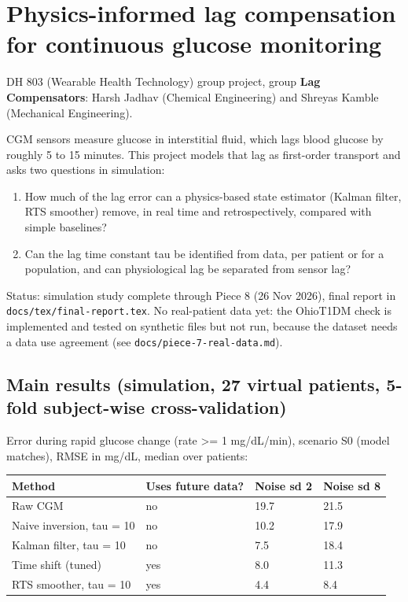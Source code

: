 \documentclass[11pt,a4paper]{article}
\providecommand{\tightlist}{\setlength{\itemsep}{0pt}\setlength{\parskip}{0pt}}
\begin{document}
\hypertarget{physics-informed-lag-compensation-for-continuous-glucose-monitoring}{%
\section{Physics-informed lag compensation for continuous glucose
monitoring}\label{physics-informed-lag-compensation-for-continuous-glucose-monitoring}}

DH 803 (Wearable Health Technology) group project, group \textbf{Lag
Compensators}: Harsh Jadhav (Chemical Engineering) and Shreyas Kamble
(Mechanical Engineering).

CGM sensors measure glucose in interstitial fluid, which lags blood
glucose by roughly 5 to 15 minutes. This project models that lag as
first-order transport and asks two questions in simulation:

\begin{enumerate}
\def\labelenumi{\arabic{enumi}.}
\tightlist
\item
  How much of the lag error can a physics-based state estimator (Kalman
  filter, RTS smoother) remove, in real time and retrospectively,
  compared with simple baselines?
\item
  Can the lag time constant tau be identified from data, per patient or
  for a population, and can physiological lag be separated from sensor
  lag?
\end{enumerate}

Status: simulation study complete through Piece 8 (26 Nov 2026), final
report in \texttt{docs/tex/final-report.tex}. No real-patient data yet:
the OhioT1DM check is implemented and tested on synthetic files but not
run, because the dataset needs a data use agreement (see
\texttt{docs/piece-7-real-data.md}).

\hypertarget{main-results-simulation-27-virtual-patients-5-fold-subject-wise-cross-validation}{%
\subsection{Main results (simulation, 27 virtual patients, 5-fold
subject-wise
cross-validation)}\label{main-results-simulation-27-virtual-patients-5-fold-subject-wise-cross-validation}}

Error during rapid glucose change (\textbar rate\textbar{} \textgreater=
1 mg/dL/min), scenario S0 (model matches), RMSE in mg/dL, median over
patients:

\begin{longtable}[]{@{}llll@{}}
\toprule\noalign{}
Method & Uses future data? & Noise sd 2 & Noise sd 8 \\
\midrule\noalign{}
\endhead
\bottomrule\noalign{}
\endlastfoot
Raw CGM & no & 19.7 & 21.5 \\
Naive inversion, tau = 10 & no & 10.2 & 17.9 \\
Kalman filter, tau = 10 & no & 7.5 & 18.4 \\
Time shift (tuned) & yes & 8.0 & 11.3 \\
RTS smoother, tau = 10 & yes & 4.4 & 8.4 \\
\end{longtable}
\end{document}
